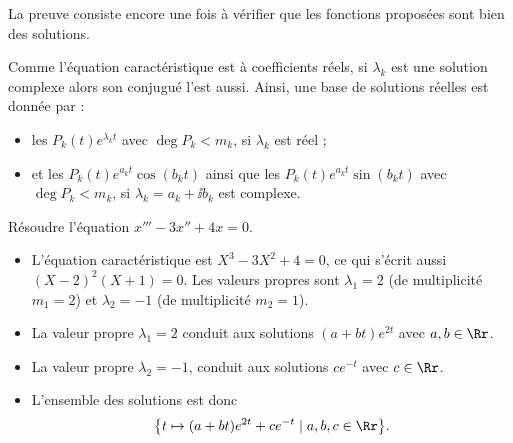 \documentclass[12pt, class=report,crop=false]{standalone}
\begin{document}
La preuve consiste encore une fois à vérifier que les fonctions proposées sont bien des solutions.


Comme l'équation caractéristique est à coefficients réels,  
si $\lambda_k$ est une solution complexe alors son conjugué l'est aussi.
Ainsi, une base  de solutions réelles est donnée par :
\begin{itemize}
  \item les $P_k(t)e^{\lambda_k t}$ avec $\deg P_k < m_k$, si $\lambda_k$ est réel ;
  \item et les $P_k(t) e^{a_k t} \cos(b_kt)$ ainsi que
  les $P_k(t) e^{a_k t} \sin(b_kt)$ avec $\deg P_k < m_k$, si $\lambda_k = a_k + \ii b_k$ est complexe.
\end{itemize}
  
\begin{exemple}
Résoudre l'équation $x''' - 3x'' + 4 x=0$.

\begin{itemize}
  \item L'équation caractéristique est $X^3 - 3X^2 + 4=0$, ce qui s'écrit aussi
$(X-2)^2(X+1)=0$. Les valeurs propres sont $\lambda_1 = 2$ (de multiplicité $m_1 = 2$)
et $\lambda_2 = -1$ (de multiplicité $m_2 = 1$).

  \item La valeur propre $\lambda_1 = 2$ conduit aux solutions
  $(a+bt)e^{2t}$ avec $a,b \in \Rr$.

  \item La valeur propre $\lambda_2 = -1$, conduit aux solutions $ce^{-t}$ avec $c\in\Rr$.
  
  \item L'ensemble des solutions est donc
  $$\big\{ t \mapsto (a+bt)e^{2t} + ce^{-t} \mid a,b,c \in \Rr \big\}.$$
\end{itemize}
\end{exemple}
\end{document}

